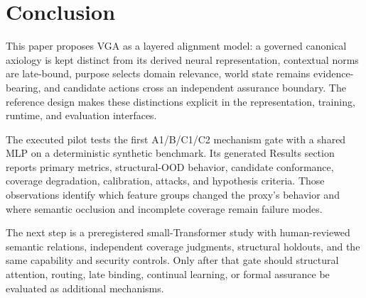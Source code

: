 \section{Conclusion}
\label{sec:conclusion}

This paper proposes VGA as a layered alignment model: a governed canonical axiology is kept distinct from its derived neural representation, contextual norms are late-bound, purpose selects domain relevance, world state remains evidence-bearing, and candidate actions cross an independent assurance boundary. The reference design makes these distinctions explicit in the representation, training, runtime, and evaluation interfaces.

The executed pilot tests the first A1/B/C1/C2 mechanism gate with a shared MLP on a deterministic synthetic benchmark. Its generated Results section reports primary metrics, structural-OOD behavior, candidate conformance, coverage degradation, calibration, attacks, and hypothesis criteria. Those observations identify which feature groups changed the proxy's behavior and where semantic occlusion and incomplete coverage remain failure modes.

The next step is a preregistered small-Transformer study with human-reviewed semantic relations, independent coverage judgments, structural holdouts, and the same capability and security controls. Only after that gate should structural attention, routing, late binding, continual learning, or formal assurance be evaluated as additional mechanisms.
